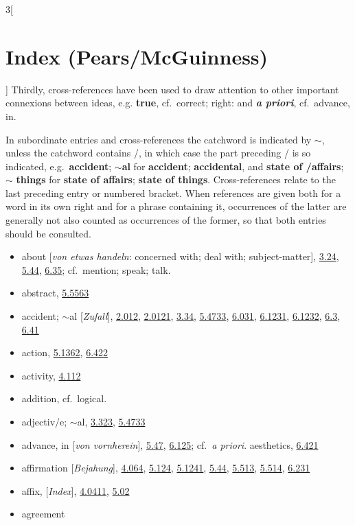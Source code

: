 \documentclass[oneside,openany,12pt]{book}
\newcommand{\indexentry}[1]{\item #1}
\newcommand{\indexref}[1]{\hyperlink{prop#1}{#1}}
\begin{document}
\begin{multicols}{3}[\section*{Index (Pears/McGuinness)}]
Thirdly, cross-references have been used to draw attention to other important connexions between ideas, e.g. \textbf{true}, cf.\ correct; right: and \textbf{\textit{a priori}}, cf.\ advance, in.

In subordinate entries and cross-references the catchword is indicated by $\sim$, unless the catchword contains /, in which case the part preceding / is so indicated, e.g.\ \textbf{accident}; $\sim$\textbf{al} for \textbf{accident}; \textbf{accidental}, and \textbf{state of /affairs}; $\sim$ \textbf{things} for \textbf{state of affairs}; \textbf{state of things}. Cross-references relate to the last preceding entry or numbered bracket. When references are given both for a word in its own right and for a phrase containing it, occurrences of the latter are generally not also counted as occurrences of the former, so that both entries should be consulted.%


\bigskip

\bigskip

\begin{itemize}
\raggedright
\indexentry{about [\textit{von etwas handeln}: concerned with; deal with; subject-matter], \indexref{3.24}, \indexref{5.44}, \indexref{6.35}; cf.\ mention; speak; talk.}

\indexentry{abstract, \indexref{5.5563}}

\indexentry{accident; $\sim$al [\textit{Zufall}], \indexref{2.012}, \indexref{2.0121}, \indexref{3.34}, \indexref{5.4733}, \indexref{6.031}, \indexref{6.1231}, \indexref{6.1232}, \indexref{6.3}, \indexref{6.41}}

\indexentry{action, \indexref{5.1362}, \indexref{6.422}}

\indexentry{activity, \indexref{4.112}}

\indexentry{addition, cf.\ logical.}

\indexentry{adjectiv/e; $\sim$al, \indexref{3.323}, \indexref{5.4733}}

\indexentry{advance, in [\textit{von vornherein}], \indexref{5.47}, \indexref{6.125}; cf.\ \textit{a priori}. aesthetics, \indexref{6.421}}

\indexentry{affirmation [\textit{Bejahung}], \indexref{4.064}, \indexref{5.124}, \indexref{5.1241}, \indexref{5.44}, \indexref{5.513}, \indexref{5.514}, \indexref{6.231}}

\indexentry{affix, [\textit{Index}], \indexref{4.0411}, \indexref{5.02}}

\indexentry{agreement}


\end{itemize}
\end{multicols}
\end{document}
